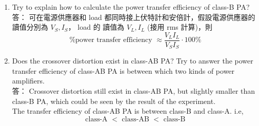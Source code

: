 \documentclass[12pt, a4paper]{article}
\begin{document}
\begin{enumerate}[itemsep=20pt, topsep=10pt]
  \item {Try to explain how to calculate the power transfer efficiency of class-B PA? } \\[10pt]
    答： 可在電源供應器和 load 都同時接上伏特計和安倍計，假設電源供應器的讀值分別為 $V_S, I_S$， load 的
    讀值為 $V_L, I_L$ (接用 rms 計算)，則 
    \[ \text{\%power transfer efficiency }  \approx \frac{V_L I_L}{V_S I_S} \cdot 100\% \] 

  \item {Does the crossover distortion exist in class-AB PA? Try to answer the 
       power transfer efficiency of class-AB PA is between which two kinds of 
     power amplifiers. } \\[10pt]
  答： Crossover distortion still exist in class-AB PA, but slightly smaller than class-B PA,
  which could be seen by the result of the experiment. \\
  The transfer efficiency of class-AB PA is between class-B and class-A. i.e,
  \[
    \text{class-A } < \text{ class-AB } < \text{ class-B}
  \]


\end{enumerate}
\end{document}
